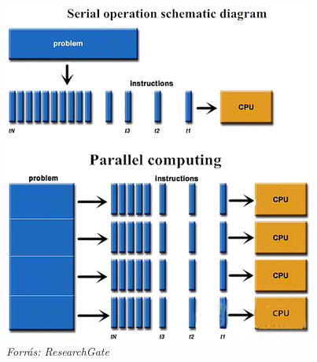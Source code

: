 \begin{frame}
\begin{columns}
	\begin{figure}
		\includegraphics[width=\textwidth]{img/serial-parallel.png}
		{\hspace*{\fill}\tiny\textit{Forrás: ResearchGate}}
	\end{figure}
\end{columns}

\end{frame}